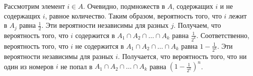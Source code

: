 \documentclass{article}
\begin{document}
Рассмотрим элемент $i \in A$. Очевидно, подмножеств в $A$, содержащих $i$ и не содержащих $i$, равное количество. Таким образом, вероятность того, что $i$ лежит в $A_j$ равна $\frac12$. Эти вероятности независимы для разных $j$. Получаем, что вероятность того, что $i$ содержится в $A_1 \cap A_2 \cap \ldots \cap A_k$ равна $\frac{1}{2^k}$. Соответственно, вероятность того, что $i$ не содержится в $A_1 \cap A_2 \cap \ldots \cap A_k$ равна $1 - \frac{1}{2^k}$. Эти вероятности независимы для разных $i$. Получается, что вероятность того, что ни один из номеров $i$ не попал в $A_1 \cap A_2 \cap \ldots \cap A_k$ равна $(1 - \frac{1}{2^k})^n$.
\end{document}
